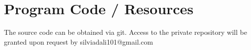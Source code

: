 \documentclass[11pt,titlepage,oneside,openany]{book}
\begin{document}


\appendix

\chapter{Program Code / Resources}
\label{cha:appendix-a}

The source code can be obtained via git. Access to the private repository will be granted upon request by silviadali101@gmail.com



\newpage
\end{document}
